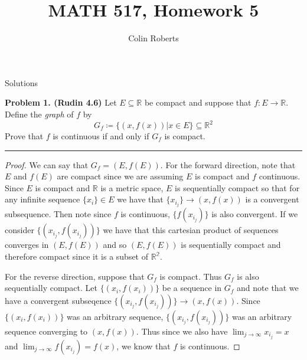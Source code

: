 \documentclass[leqno]{article}
\author{Colin Roberts}
\title{MATH 517, Homework 5}
\theoremstyle{nonumberplain}
\newtheorem{proof}{Proof}
\begin{document}
\maketitle
\begin{large}
\begin{center}
Solutions
\end{center}
\end{large}
\pagebreak


\noindent\textbf{Problem 1. (Rudin 4.6)} Let $E\subseteq \mathbb{R}$ be compact and suppose that $f\colon E\to \mathbb{R}$. Define the \emph{graph} of $f$ by
\[
G_f \coloneqq \{(x,f(x))\vert x\in E\}\subseteq \mathbb{R}^2
\]
Prove that $f$ is continuous if and only if $G_f$ is compact.
 

\noindent\rule[0.5ex]{\linewidth}{1pt}

\begin{proof}
We can say that $G_f=(E,f(E))$.  For the forward direction, note that $E$ and $f(E)$ are compact since we are assuming $E$ is compact and $f$ continuous.  Since $E$ is compact and $\mathbb{R}$ is a metric space, $E$ is sequentially compact so that for any infinite sequence $\{x_i\}\in E$ we have that $\{x_{i_j}\}\to (x,f(x))$ is a convergent subsequence.  Then note since $f$ is continuous, $\{f(x_{i_j})\}$ is also convergent.  If we consider $\{(x_{i_j},f(x_{i_j}))\}$ we have that this cartesian product of sequences converges in $(E,f(E))$ and so $(E,f(E))$ is sequentially compact and therefore compact since it is a subset of $\mathbb{R^2}$. 

For the reverse direction, suppose that $G_f$ is compact. Thus $G_f$ is also sequentially compact.  Let $\{(x_i,f(x_i))\}$ be a sequence in $G_f$ and note that we have a convergent subseqence $\{(x_{i_j},f(x_{i_j}))\}\to (x,f(x))$.  Since $\{(x_i,f(x_i))\}$ was an arbitrary sequence, $\{(x_{i_j},f(x_{i_j}))\}$ was an arbitrary sequence converging to $(x,f(x))$.  Thus since we also have $\lim_{j\to \infty} x_{i_j}=x$ and $\lim_{j \to \infty} f(x_{i_j})=f(x)$, we know that $f$ is continuous.
\end{proof}

\pagebreak
\end{document}
